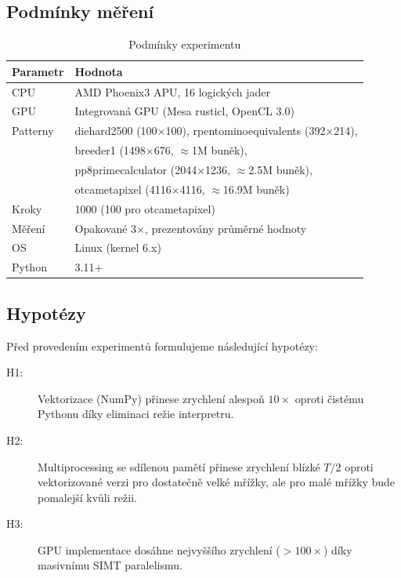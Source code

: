 \documentclass[12pt,a4paper]{article}
\begin{document}
\subsection{Podmínky měření}

\begin{table}[H]
\centering
\begin{tabular}{@{}ll@{}}
\toprule
\textbf{Parametr} & \textbf{Hodnota} \\
\midrule
CPU         & AMD Phoenix3 APU, 16 logických jader \\
GPU         & Integrovaná GPU (Mesa rusticl, OpenCL 3.0) \\
Patterny    & diehard2500 (100$\times$100), rpentominoequivalents (392$\times$214), \\
            & breeder1 (1498$\times$676, $\approx$1M buněk), \\
            & pp8primecalculator (2044$\times$1236, $\approx$2.5M buněk), \\
            & otcametapixel (4116$\times$4116, $\approx$16.9M buněk) \\
Kroky       & 1000 (100 pro otcametapixel) \\
Měření      & Opakované 3$\times$, prezentovány průměrné hodnoty \\
OS          & Linux (kernel 6.x) \\
Python      & 3.11+ \\
\bottomrule
\end{tabular}
\caption{Podmínky experimentu}
\end{table}

\subsection{Hypotézy}

Před provedením experimentů formulujeme následující hypotézy:

\begin{description}
    \item[H1:] Vektorizace (NumPy) přinese zrychlení alespoň $10\times$ oproti čistému Pythonu díky eliminaci režie interpretru.
    \item[H2:] Multiprocessing se sdílenou pamětí přinese zrychlení blízké $T/2$ oproti vektorizované verzi pro dostatečně velké mřížky, ale pro malé mřížky bude pomalejší kvůli režii.
    \item[H3:] GPU implementace dosáhne nejvyššího zrychlení ($>100\times$) díky masivnímu SIMT paralelismu.
\end{description}
\end{document}
